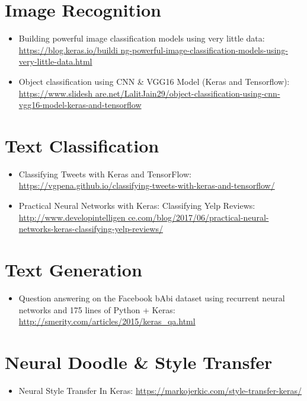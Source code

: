 \documentclass[10pt,twoside,a4paper,openany]{memoir}
\begin{document}
\section{Image Recognition}
\begin{itemize}
\item Building powerful image classification models using very little data: \href{https://blog.keras.io/building-powerful-image-classification-models-using-very-little-data.html}{https://blog.keras.io/buildi ng-powerful-image-classification-models-using-very-little-data.html}
\item Object classification using CNN \& VGG16 Model (Keras and Tensorflow): \href{https://www.slideshare.net/LalitJain29/object-classification-using-cnn-vgg16-model-keras-and-tensorflow}{https://www.slidesh are.net/LalitJain29/object-classification-using-cnn-vgg16-model-keras-and-tensorflow}
\end{itemize}

\section{Text Classification}
\begin{itemize}
\item Classifying Tweets with Keras and TensorFlow: \href{https://vgpena.github.io/classifying-tweets-with-keras-and-tensorflow/}{https://vgpena.github.io/classifying-tweets-with-keras-and-tensorflow/}
\item Practical Neural Networks with Keras: Classifying Yelp Reviews: \href{http://www.developintelligence.com/blog/2017/06/practical-neural-networks-keras-classifying-yelp-reviews/}{http://www.developintelligen ce.com/blog/2017/06/practical-neural-networks-keras-classifying-yelp-reviews/}
\end{itemize}

\section{Text Generation}
\begin{itemize}
\item Question answering on the Facebook bAbi dataset using recurrent neural networks and 175 lines of Python + Keras: \href{http://smerity.com/articles/2015/keras_qa.html}{http://smerity.com/articles/2015/keras\_qa.html}
\end{itemize}

\section{Neural Doodle \& Style Transfer}
\begin{itemize}
\item Neural Style Transfer In Keras: \href{https://markojerkic.com/style-transfer-keras/}{https://markojerkic.com/style-transfer-keras/}
\end{itemize}
\end{document}
